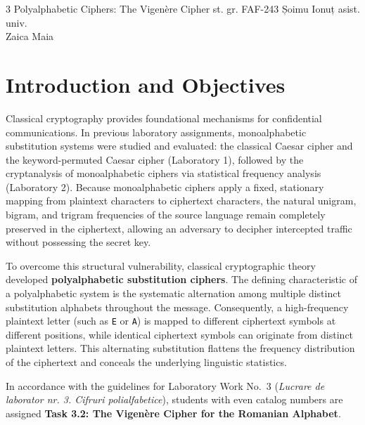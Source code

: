 \documentclass{labreport}
\begin{document}
\hypersetup{pageanchor=false}
\labtitle
    {3}
    {Polyalphabetic Ciphers: The Vigenère Cipher}
    {st. gr. FAF-243}
    {Șoimu Ionuț}
    {asist. univ.\\[0.15cm] Zaica Maia}

\tableofcontents
\newpage
\hypersetup{pageanchor=true}
\setcounter{page}{1}

\section{Introduction and Objectives}

Classical cryptography provides foundational mechanisms for confidential communications. In previous laboratory assignments, monoalphabetic substitution systems were studied and evaluated: the classical Caesar cipher and the keyword-permuted Caesar cipher (Laboratory 1), followed by the cryptanalysis of monoalphabetic ciphers via statistical frequency analysis (Laboratory 2). Because monoalphabetic ciphers apply a fixed, stationary mapping from plaintext characters to ciphertext characters, the natural unigram, bigram, and trigram frequencies of the source language remain completely preserved in the ciphertext, allowing an adversary to decipher intercepted traffic without possessing the secret key.

To overcome this structural vulnerability, classical cryptographic theory developed \textbf{polyalphabetic substitution ciphers}. The defining characteristic of a polyalphabetic system is the systematic alternation among multiple distinct substitution alphabets throughout the message. Consequently, a high-frequency plaintext letter (such as \texttt{E} or \texttt{A}) is mapped to different ciphertext symbols at different positions, while identical ciphertext symbols can originate from distinct plaintext letters. This alternating substitution flattens the frequency distribution of the ciphertext and conceals the underlying linguistic statistics.

In accordance with the guidelines for Laboratory Work No.~3 (\textit{Lucrare de laborator nr. 3. Cifruri polialfabetice}), students with even catalog numbers are assigned \textbf{Task 3.2: The Vigenère Cipher for the Romanian Alphabet}.
\end{document}

